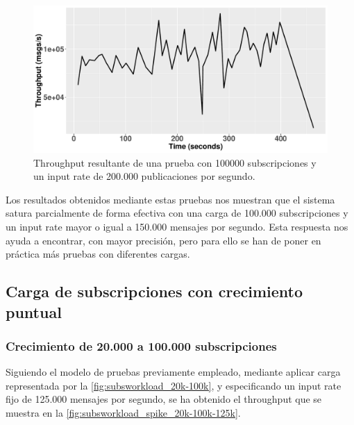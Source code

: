 \begin{figure}[htpb]
    \centering
    \includegraphics[width=\textwidth]{images/th_subs_workload-100k-200k.pdf}
    \caption{Throughput resultante de una prueba con 100000 subscripciones y un input rate de 200.000 publicaciones por segundo.}
    \label{fig:subsworkload_100k-200k}
\end{figure}

Los resultados obtenidos mediante estas pruebas nos muestran que el sistema satura
parcialmente de forma efectiva con una carga de 100.000 subscripciones y un input rate
mayor o igual a 150.000 mensajes por segundo. Esta respuesta nos ayuda a encontrar, con
mayor precisión, pero para ello se han de poner en práctica más pruebas con diferentes
cargas.

\subsection*{Carga de subscripciones con crecimiento puntual}

\subsubsection*{Crecimiento de 20.000 a 100.000 subscripciones}

Siguiendo el modelo de pruebas previamente empleado, mediante aplicar carga 
representada por la \autoref{fig:subsworkload_20k-100k}, y especificando un 
input rate fijo de 125.000 mensajes por segundo, se ha obtenido el throughput
que se muestra en la \autoref{fig:subsworkload_spike_20k-100k-125k}.

